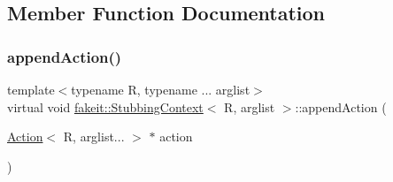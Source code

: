 \subsection{Member Function Documentation}
\mbox{\label{structfakeit_1_1StubbingContext_a01b3a9b0240fa1b7cdd4401b19d04576}} 
\subsubsection{\texorpdfstring{appendAction()}{appendAction()}\hspace{0.1cm}{\footnotesize\ttfamily [1/9]}}
{\footnotesize\ttfamily template$<$typename R, typename ... arglist$>$ \\
virtual void \mbox{\hyperlink{structfakeit_1_1StubbingContext}{fakeit\+::\+Stubbing\+Context}}$<$ R, arglist $>$\+::append\+Action (\begin{DoxyParamCaption}\item[{\mbox{\hyperlink{structfakeit_1_1Action}{Action}}$<$ R, arglist... $>$ $\ast$}]{action }\end{DoxyParamCaption})\hspace{0.3cm}{\ttfamily [pure virtual]}}



